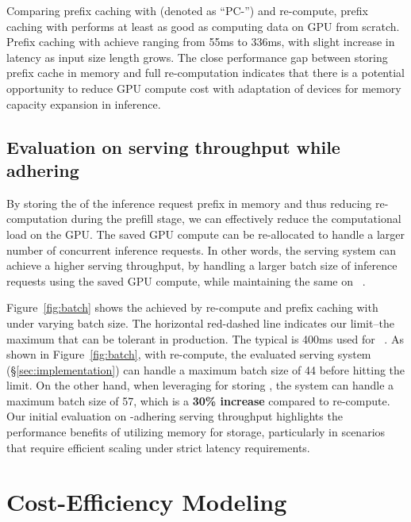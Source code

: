 Comparing prefix caching with \cxl (denoted as ``PC-\cxl'') and \kv re-compute, prefix caching with \cxl performs at least as good as computing \kv data on GPU from scratch. Prefix caching with \cxl achieve \ttft ranging from 55ms to 336ms, with slight increase in latency as input size length grows. The close performance gap between storing prefix \kv cache in \cxl memory and full \kv re-computation indicates that there is a potential opportunity to reduce GPU compute cost with adaptation of \cxl devices for memory capacity expansion in \llm inference.

\subsection{Evaluation on serving throughput while adhering \slo}
\label{sec:eval:throughput}

By storing the \kvcache of the inference request prefix in \cxl memory and thus reducing re-computation during the prefill stage, we can effectively reduce the computational load on the GPU.
The saved GPU compute can be re-allocated to handle a larger number of concurrent inference requests. 
In other words, the \llm serving system can achieve a higher serving throughput, by handling a larger batch size of inference requests using the saved GPU compute, while maintaining the same \slo on \ttft~\cite{distserve}.

Figure~\ref{fig:batch} shows the \ttft achieved by \kv re-compute and prefix caching with \cxl under varying batch size.
The horizontal red-dashed line indicates our \slo limit--the maximum \ttft that can be tolerant in production.
The typical \slo is 400ms used for ~\cite{ttft}.
As shown in Figure~\ref{fig:batch}, with \kv re-compute, the evaluated serving system (\S\ref{sec:implementation}) can handle a maximum batch size of 44 before hitting the \slo limit.
On the other hand, when leveraging \cxl for storing \kvcache, the system can handle a maximum batch size of 57, which is a \textbf{30\% increase} compared to \kv re-compute. 
Our initial evaluation on \slo-adhering serving throughput highlights the performance benefits of utilizing \cxl memory for \kvcache storage, particularly in scenarios that require efficient scaling under strict latency requirements.

\section{Cost-Efficiency Modeling}
\label{sec:roi}

